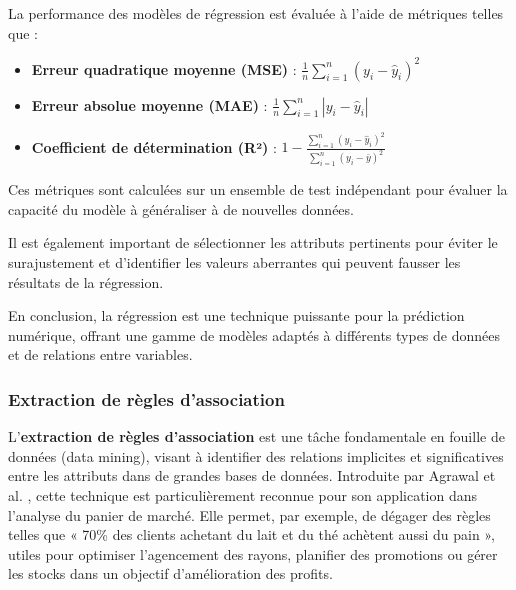 \documentclass[a4paper,14pt]{article}
\begin{document}

La performance des modèles de régression est évaluée à l’aide de métriques telles que :

\begin{itemize}
    \item \textbf{Erreur quadratique moyenne (MSE)} : \(\frac{1}{n} \sum_{i=1}^n (y_i - \hat{y}_i)^2\)
    \item \textbf{Erreur absolue moyenne (MAE)} : \(\frac{1}{n} \sum_{i=1}^n |y_i - \hat{y}_i|\)
    \item \textbf{Coefficient de détermination (R²)} : \(1 - \frac{\sum_{i=1}^n (y_i - \hat{y}_i)^2}{\sum_{i=1}^n (y_i - \bar{y})^2}\)
\end{itemize}

Ces métriques sont calculées sur un ensemble de test indépendant pour évaluer la capacité du modèle à généraliser à de nouvelles données.

Il est également important de sélectionner les attributs pertinents pour éviter le surajustement et d’identifier les valeurs aberrantes qui peuvent fausser les résultats de la régression.

En conclusion, la régression est une technique puissante pour la prédiction numérique, offrant une gamme de modèles adaptés à différents types de données et de relations entre variables.  

        \subsubsection{Extraction de règles d’association}
        
        L'\textbf{extraction de règles d’association} est une tâche fondamentale en fouille de données (data mining), visant à identifier des relations implicites et significatives entre les attributs dans de grandes bases de données. Introduite par Agrawal et al. , cette technique est particulièrement reconnue pour son application dans l’analyse du panier de marché. Elle permet, par exemple, de dégager des règles telles que « 70\% des clients achetant du lait et du thé achètent aussi du pain », utiles pour optimiser l’agencement des rayons, planifier des promotions ou gérer les stocks dans un objectif d’amélioration des profits.
        
\end{document}
